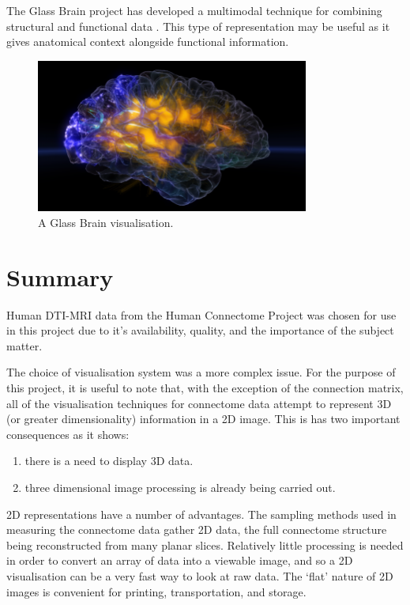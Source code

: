 \documentclass[MSc,paper=a4,pagesize=auto]{icldt}
\begin{document}
The Glass Brain project has developed a multimodal technique for combining structural and functional data \cite{GlassBrain2014}. This type of representation may be useful as it gives anatomical context alongside functional information. 

\begin{figure}[htbp!]
    \centering
    \includegraphics[width=0.8\textwidth]{resources/glass_brain}
    \caption{A Glass Brain visualisation. \cite{GlassBrain2014}}
    \label{fig:glass_brain}
\end{figure}

\section{Summary}
Human DTI-MRI data from the Human Connectome Project was chosen for use in this project due to it's availability, quality, and the importance of the subject matter.

The choice of visualisation system was a more complex issue. For the purpose of this project, it is useful to note that, with the exception of the connection matrix, all of the visualisation techniques for connectome data attempt to represent 3D (or greater dimensionality) information in a 2D image. This is has two important consequences as it shows:
\begin{enumerate}
\item there is a need to display 3D data.
\item three dimensional image processing is already being carried out.
\end{enumerate}

2D representations have a number of advantages. The sampling methods used in measuring the connectome data gather 2D data, the full connectome structure being reconstructed from many planar slices. Relatively little processing is needed in order to convert an array of data into a viewable image, and so a 2D visualisation can be a very fast way to look at raw data. The ‘flat’ nature of 2D images is convenient for printing, transportation, and storage. 
\end{document}
